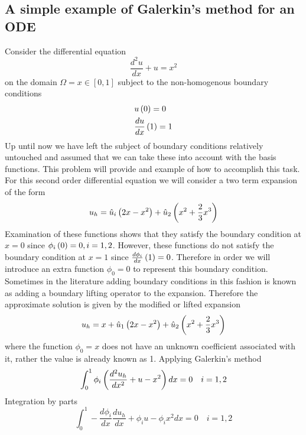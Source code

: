 \subsection{A simple example of Galerkin's method for an ODE}
Consider the differential equation 
\begin{equation}
\frac{d^{2} u }{dx} + u = x^2
\end{equation}
on the domain $\Omega = x \in[0,1]$ subject to the non-homogenous boundary conditions 
\begin{equation} 
\begin{split} 
& u\left( 0 \right) = 0 \\ 
& \frac{d u}{dx}\left( 1 \right) = 1
\end{split}
\end{equation}
Up until now we have left the subject of boundary conditions relatively untouched and assumed that we can take these into account with the basis functions.  This problem will provide and example of how to accomplish this task.  For this second order differential equation we will consider a two term expansion of the form 
\begin{equation}
u_{h} = \hat{u}_{i} \left( 2x - x^{2} \right) + \hat{u}_{2}\left( x^{2} + \frac{2}{3}x^{3} \right) 
\end{equation}
Examination of these functions shows that they satisfy the boundary condition at $x = 0$ since $\phi_{i}\left( 0 \right) = 0, i = 1,2$.  However, these functions do not satisfy the boundary condition at $x = 1$ since $\frac{d \phi_{i}}{dx} \left( 1 \right) = 0$.  Therefore in order we will introduce an extra function $\phi_{0} = 0$ to represent this boundary condition.  Sometimes in the literature adding boundary conditions in this fashion is known as adding a boundary lifting operator to the expansion.  Therefore the approximate solution is given by the modified or lifted expansion
\begin{equation}
u_{h} = x + \hat{u}_{1} \left( 2x - x^{2} \right) + \hat{u}_{2}\left( x^{2} + \frac{2}{3}x^{3} \right) 
\end{equation}   
where the function $\phi_{0} = x$ does not have an unknown coefficient associated with it, rather the value is already known as 1.  Applying Galerkin's method 
\begin{equation}
\begin{split}
\int_{0}^{1} \phi_{i}\left(  \frac{d^{2} u_{h} }{dx^{2}} + u - x^{2}  \right) dx = 0 \quad i = 1,2
\end{split}
\end{equation}
Integration by parts
\begin{equation}
\int_{0}^{1} -\frac{d \phi_{i}}{dx} \frac{d u_{h} }{dx} + \phi_{i}u - \phi_{i} x^{2} dx = 0 \quad i = 1,2
\end{equation}

